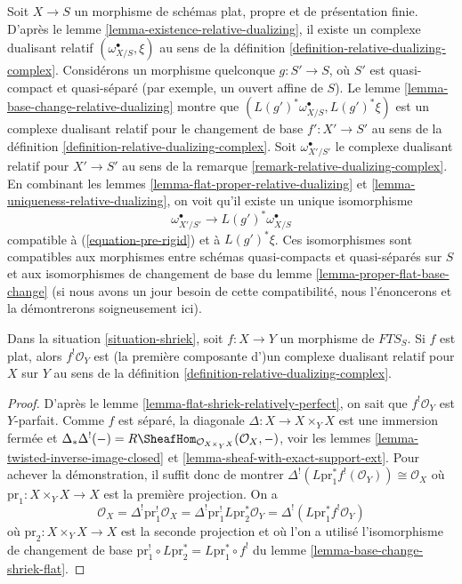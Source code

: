 \begin{remark}
\label{remark-relative-dualizing-complex-bis}
Soit $X \to S$ un morphisme de schémas plat, propre et de présentation finie. D'après le lemme \ref{lemma-existence-relative-dualizing}, il existe un complexe dualisant relatif $(\omega_{X/S}^\bullet, \xi)$ au sens de la définition \ref{definition-relative-dualizing-complex}. Considérons un morphisme quelconque $g : S' \to S$, où $S'$ est quasi-compact et quasi-séparé (par exemple, un ouvert affine de $S$). Le lemme \ref{lemma-base-change-relative-dualizing} montre que $(L(g')^*\omega_{X/S}^\bullet, L(g')^*\xi)$ est un complexe dualisant relatif pour le changement de base $f' : X' \to S'$ au sens de la définition \ref{definition-relative-dualizing-complex}. Soit $\omega_{X'/S'}^\bullet$ le complexe dualisant relatif pour $X' \to S'$ au sens de la remarque \ref{remark-relative-dualizing-complex}. En combinant les lemmes \ref{lemma-flat-proper-relative-dualizing} et \ref{lemma-uniqueness-relative-dualizing}, on voit qu'il existe un unique isomorphisme
$$
\omega_{X'/S'}^\bullet \longrightarrow L(g')^*\omega_{X/S}^\bullet
$$
compatible à (\ref{equation-pre-rigid}) et à $L(g')^*\xi$. Ces isomorphismes sont compatibles aux morphismes entre schémas quasi-compacts et quasi-séparés sur $S$ et aux isomorphismes de changement de base du lemme \ref{lemma-proper-flat-base-change} (si nous avons un jour besoin de cette compatibilité, nous l'énoncerons et la démontrerons soigneusement ici).
\end{remark}

\begin{lemma}
\label{lemma-compactifyable-relative-dualizing}
Dans la situation \ref{situation-shriek}, soit $f : X \to Y$ un morphisme de $\textit{FTS}_S$. Si $f$ est plat, alors $f^!\mathcal{O}_Y$ est (la première composante d')un complexe dualisant relatif pour $X$ sur $Y$ au sens de la définition \ref{definition-relative-dualizing-complex}.
\end{lemma}

\begin{proof}
D'après le lemme \ref{lemma-flat-shriek-relatively-perfect}, on sait que $f^!\mathcal{O}_Y$ est $Y$-parfait. Comme $f$ est séparé, la diagonale $\Delta : X \to X \times_Y X$ est une immersion fermée et $\Delta_*\Delta^!(-) =
R\SheafHom_{\mathcal{O}_{X \times_Y X}}(\mathcal{O}_X, -)$, voir les lemmes \ref{lemma-twisted-inverse-image-closed} et \ref{lemma-sheaf-with-exact-support-ext}. Pour achever la démonstration, il suffit donc de montrer
$\Delta^!(L\text{pr}_1^*f^!(\mathcal{O}_Y)) \cong \mathcal{O}_X$
où $\text{pr}_1 : X \times_Y X \to X$ est la première projection. On a
$$
\mathcal{O}_X = \Delta^! \text{pr}_1^!\mathcal{O}_X =
\Delta^! \text{pr}_1^! L\text{pr}_2^*\mathcal{O}_Y =
\Delta^!(L\text{pr}_1^* f^!\mathcal{O}_Y)
$$
où $\text{pr}_2 : X \times_Y X \to X$ est la seconde projection et où l'on a utilisé l'isomorphisme de changement de base $\text{pr}_1^! \circ L\text{pr}_2^* = L\text{pr}_1^* \circ f^!$ du lemme \ref{lemma-base-change-shriek-flat}.
\end{proof}

